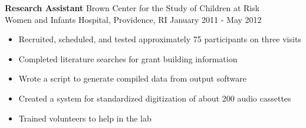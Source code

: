 \documentclass[line,margin,10pt]{res}
\begin{document}
\begin{resume}
\textbf{Research Assistant} \hfill Brown Center for the Study  of Children at Risk\\
Women and Infants Hospital, Providence, RI \hfill January 2011 - May 2012 \
\begin{itemize} \itemsep -2pt
	\item Recruited, scheduled, and tested approximately 75 participants on three visits
	\item Completed literature searches for grant building information
	\item Wrote a script to generate compiled data from output software
	\item Created a system for standardized digitization of about 200 audio cassettes 
	\item Trained volunteers to help in the lab
	\end{itemize}
	

\end{resume}
\end{document}
